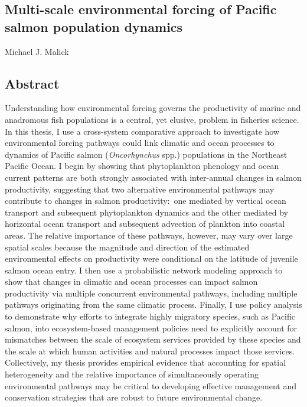 \documentclass[11pt]{report}
\begin{document}

\begin{center}
  \subsection*{Multi-scale environmental forcing of Pacific salmon population
               dynamics}

  Michael J. Malick

\end{center}

\subsection*{Abstract}

Understanding how environmental forcing governs the productivity of marine and
anadromous fish populations is a central, yet elusive, problem in fisheries
science. In this thesis, I use a cross-system comparative approach to
investigate how environmental forcing pathways could link climatic and ocean
processes to dynamics of Pacific salmon (\textit{Oncorhynchus} spp.) populations
in the Northeast Pacific Ocean. I begin by showing that phytoplankton phenology
and ocean current patterns are both strongly associated with inter-annual
changes in salmon productivity, suggesting that two alternative environmental
pathways may contribute to changes in salmon productivity:~one mediated by
vertical ocean transport and subsequent phytoplankton dynamics and the other
mediated by horizontal ocean transport and subsequent advection of plankton into
coastal areas. The relative importance of these pathways, however, may vary over
large spatial scales because the magnitude and direction of the estimated
environmental effects on productivity were conditional on the latitude of
juvenile salmon ocean entry. I then use a probabilistic network modeling
approach to show that changes in climatic and ocean processes can impact salmon
productivity via multiple concurrent environmental pathways, including multiple
pathways originating from the same climatic process. Finally, I use policy
analysis to demonstrate why efforts to integrate highly migratory species, such
as Pacific salmon, into ecosystem-based management policies need to explicitly
account for mismatches between the scale of ecosystem services provided by these
species and the scale at which human activities and natural processes impact
those services. Collectively, my thesis provides empirical evidence that
accounting for spatial heterogeneity and the relative importance of
simultaneously operating environmental pathways may be critical to developing
effective management and conservation strategies that are robust to future
environmental change.
\end{document}
